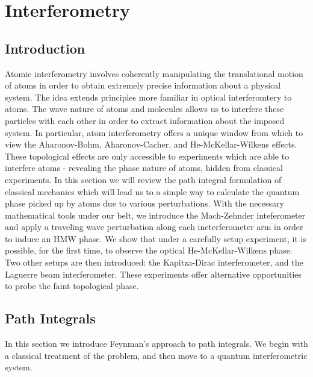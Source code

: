 \chapter{Interferometry}





\section{Introduction}

Atomic interferometry involves coherently manipulating the translational motion of atoms in order to obtain extremely precise information about a physical system. The idea extends principles more
familiar in optical interferomtery to atoms. The wave nature of atoms and molecules allows us to interfere these particles with each other in order to extract information about the imposed system. In particular, atom interferometry offers a unique window from which to view the Aharonov-Bohm, Aharonov-Cacher, and He-McKellar-Wilkens effects.  These topological effects are only accessible to experiments which are able to interfere atoms - revealing the phase nature of atoms, hidden from classical experiments.  In this section we will review the path integral formulation of classical mechanics which will lead us to a simple way to calculate the quantum phase picked up by atoms due to various perturbations. With the necessary mathematical tools under our belt, we introduce the Mach-Zehnder inteferometer and apply a traveling wave perturbation along each ineterferometer arm in order to induce an HMW phase.  We show that under a carefully setup experiment, it is possible, for the first time, to observe the optical He-McKellar-Wilkens phase.  Two other setups are then introduced: the Kapitza-Dirac interferometer, and the Laguerre beam interferometer.  These experiments offer alternative opportunities to probe the faint topological phase.

\newpage

\section{Path Integrals}
In this section we introduce Feynman's approach to path integrals.  We begin with a classical treatment of the problem, and then move to a quantum interferometric system.


